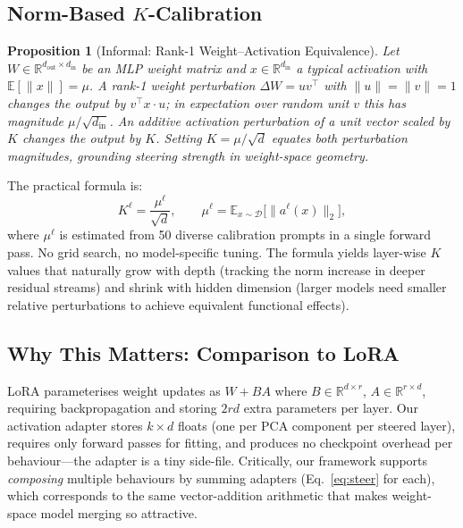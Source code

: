 \documentclass{article}
\newtheorem{proposition}{Proposition}
\begin{document}
\subsection{Norm-Based $K$-Calibration}
\label{sec:k}

\begin{proposition}[Informal: Rank-1 Weight–Activation Equivalence]
Let $W \in \mathbb{R}^{d_\mathrm{out} \times d_\mathrm{in}}$ be an MLP weight matrix and
$x \in \mathbb{R}^{d_\mathrm{in}}$ a typical activation with $\mathbb{E}[\|x\|] = \mu$.
A rank-1 weight perturbation $\Delta W = u v^\top$ with $\|u\|=\|v\|=1$ changes the
output by $v^\top x \cdot u$; in expectation over random unit $v$ this has magnitude
$\mu / \sqrt{d_\mathrm{in}}$.
An additive activation perturbation of a unit vector scaled by $K$ changes the output by $K$.
Setting $K = \mu / \sqrt{d}$ equates both perturbation magnitudes, grounding
steering strength in weight-space geometry.
\label{prop:k}
\end{proposition}

The practical formula is:
\begin{equation}
  K^\ell = \frac{\mu^\ell}{\sqrt{d}},
  \qquad \mu^\ell = \mathbb{E}_{x \sim \mathcal{D}}\bigl[\|a^\ell(x)\|_2\bigr],
  \label{eq:k}
\end{equation}
where $\mu^\ell$ is estimated from 50 diverse calibration prompts in a single forward pass.
No grid search, no model-specific tuning.
The formula yields layer-wise $K$ values that naturally grow with depth (tracking the
norm increase in deeper residual streams) and shrink with hidden dimension (larger models
need smaller relative perturbations to achieve equivalent functional effects).

\subsection{Why This Matters: Comparison to LoRA}
\label{sec:vs_lora}

LoRA parameterises weight updates as $W + BA$ where $B \in \mathbb{R}^{d \times r}$,
$A \in \mathbb{R}^{r \times d}$, requiring backpropagation and storing $2rd$ extra
parameters per layer.
Our activation adapter stores $k \times d$ floats (one per PCA component per steered
layer), requires only forward passes for fitting, and produces no checkpoint overhead
per behaviour—the adapter is a tiny side-file.
Critically, our framework supports \emph{composing} multiple behaviours by summing
adapters (Eq.~\ref{eq:steer} for each), which corresponds to the same vector-addition
arithmetic that makes weight-space model merging so attractive.
\end{document}

